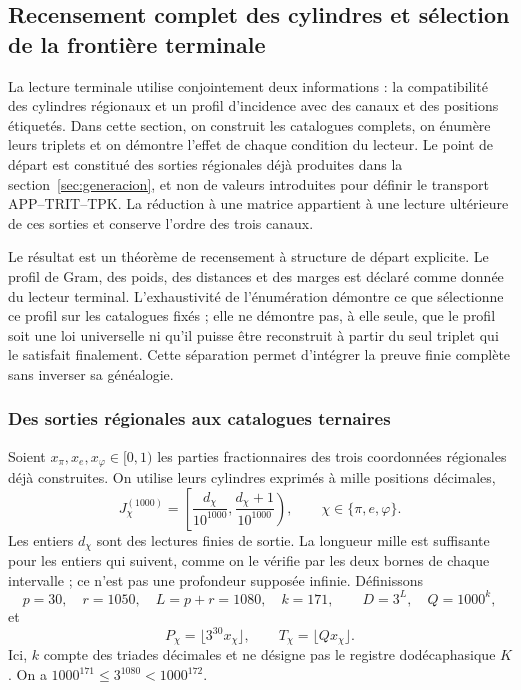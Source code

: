 \subsection{Recensement complet des cylindres et sélection de la frontière terminale}
\label{act21:censo:terminal-completo}

La lecture terminale utilise conjointement deux informations : la compatibilité des cylindres régionaux et un profil d'incidence avec des canaux et des positions étiquetés. Dans cette section, on construit les catalogues complets, on énumère leurs triplets et on démontre l'effet de chaque condition du lecteur. Le point de départ est constitué des sorties régionales déjà produites dans la section~\ref{sec:generacion}, et non de valeurs introduites pour définir le transport APP--TRIT--TPK. La réduction à une matrice appartient à une lecture ultérieure de ces sorties et conserve l'ordre des trois canaux.

Le résultat est un théorème de recensement à structure de départ explicite.
Le profil de Gram, des poids, des distances et des marges est déclaré comme donnée du
lecteur terminal. L'exhaustivité de l'énumération démontre ce que sélectionne
ce profil sur les catalogues fixés ; elle ne démontre pas, à elle seule, que le
profil soit une loi universelle ni qu'il puisse être reconstruit à partir du seul triplet
qui le satisfait finalement. Cette séparation permet d'intégrer la preuve
finie complète sans inverser sa généalogie.

\subsubsection{Des sorties régionales aux catalogues ternaires}

Soient \(x_\pi,x_e,x_\varphi\in[0,1)\) les parties fractionnaires des
trois coordonnées régionales déjà construites. On utilise leurs cylindres
exprimés à mille positions décimales,
\[
 J_\chi^{(1000)}=
 \left[\frac{d_\chi}{10^{1000}},
       \frac{d_\chi+1}{10^{1000}}\right),
 \qquad \chi\in\{\pi,e,\varphi\}.
\]
Les entiers \(d_\chi\) sont des lectures finies de sortie. La longueur mille
est suffisante pour les entiers qui suivent, comme on le vérifie par les
deux bornes de chaque intervalle ; ce n'est pas une profondeur supposée infinie.
Définissons
\begin{equation}
 p=30,\quad r=1050,\quad L=p+r=1080,\quad k=171,
 \qquad D=3^L,\quad Q=1000^k,
 \label{act21:censo:parametros}
\end{equation}
et
\[
 P_\chi=\lfloor3^{30}x_\chi\rfloor,\qquad
 T_\chi=\lfloor Qx_\chi\rfloor.
\]
Ici, \(k\) compte des triades décimales et ne désigne pas le registre dodécaphasique \(K\). On a \(1000^{171}\leq3^{1080}<1000^{172}\).

